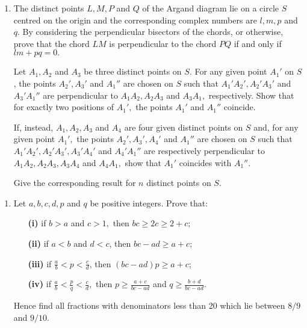 \documentclass[a4, 11pt]{report}
\newlength{\qspace}
\newcounter{qnumber}
\newenvironment{question}%
 {\vspace{\qspace}
  \begin{enumerate}[\bfseries 1\quad][10]%
    \setcounter{enumi}{\value{qnumber}}%
    \item%
 }
{
  \end{enumerate}
  \filbreak
  \stepcounter{qnumber}
 }
\begin{document}
\begin{question}
	The distinct points $L,M,P$ and $Q$ of the Argand diagram lie on
	a circle $S$ centred on the origin and the corresponding complex
	numbers are $l,m,p$ and $q$. By considering the perpendicular bisectors
	of the chords, or otherwise, prove that the chord $LM$ is perpendicular
	to the chord $PQ$ if and only if $lm+pq=0.$ 


	Let $A_{1},A_{2}$ and $A_{3}$ be three distinct points on $S$.
	For any given point $A_{1}'$ on $S$, the points $A_{2}',A_{3}'$
	and $A_{1}''$ are chosen on $S$ such that $A_{1}'A_{2}',A_{2}'A_{3}'$
	and $A_{3}'A_{1}''$ are perpendicular to $A_{1}A_{2},A_{2}A_{3}$
	and $A_{3}A_{1},$ respectively. Show that for exactly two positions
	of $A_{1}',$ the points $A_{1}'$ and $A_{1}''$ coincide. 


	If, instead, $A_{1},A_{2},A_{3}$ and $A_{4}$ are four given distinct
	points on $S$ and, for any given point $A_{1}',$ the points $A_{2}',A_{3}',A_{4}'$
	and $A_{1}''$ are chosen on $S$ such that $A_{1}'A_{2}',A_{2}'A_{3}',A_{3}'A_{4}'$
	and $A_{4}'A_{1}''$ are respectively perpendicular to $A_{1}A_{2},A_{2}A_{3},A_{3}A_{4}$
	and $A_{4}A_{1},$ show that $A_{1}'$ coincides with $A_{1}''.$ 


	Give the corresponding result for $n$ distinct points on $S$.
	\end{question}
	
	\begin{question}
Let $a,b,c,d,p$ and $q$ be positive integers. Prove that:

\begin{itemize}
\setlength{\itemsep}{3mm}
\item[\bf (i)] if $b>a$ and $c>1,$ then $bc\geqslant2c\geqslant2+c$; 
\item[\bf (ii)] if $a<b$ and $d<c$, then $bc-ad\geqslant a+c$; 
\item[\bf (iii)] if ${\displaystyle \frac{a}{b}<p<\frac{c}{d}}$, then $\left(bc-ad\right)p\geqslant a+c$; 
\item[\bf (iv)] if ${\displaystyle \frac{a}{b}<\frac{p}{q}<\frac{c}{d}},$ then ${\displaystyle p\geqslant\frac{a+c}{bc-ad}}$
and ${\displaystyle q\geqslant\frac{b+d}{bc-ad}}$. 
\end{itemize}

Hence find all fractions with denominators less than 20 which lie
between $8/9$ and $9/10$.
	 \end{question}
	 
\end{document}
